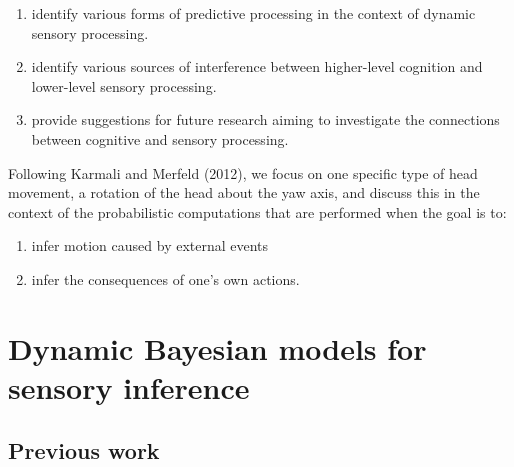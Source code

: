 \documentclass[english,floatsintext,man]{apa6}
\providecommand{\tightlist}{%
  \setlength{\itemsep}{0pt}\setlength{\parskip}{0pt}}
\theoremstyle{definition}
\theoremstyle{definition}
\theoremstyle{remark}
\begin{document}
\begin{enumerate}
\def\labelenumi{\arabic{enumi})}
\tightlist
\item
  identify various forms of predictive processing in the context of
  dynamic sensory processing.
\item
  identify various sources of interference between higher-level
  cognition and lower-level sensory processing.
\item
  provide suggestions for future research aiming to investigate the
  connections between cognitive and sensory processing.
\end{enumerate}

Following Karmali and Merfeld (2012), we focus on one specific type of
head movement, a rotation of the head about the yaw axis, and discuss
this in the context of the probabilistic computations that are performed
when the goal is to:

\begin{enumerate}
\def\labelenumi{\arabic{enumi})}
\tightlist
\item
  infer motion caused by external events
\item
  infer the consequences of one's own actions.
\end{enumerate}

\section{Dynamic Bayesian models for sensory
inference}\label{dynamic-bayesian-models-for-sensory-inference}

\subsection{Previous work}\label{previous-work}
\end{document}
